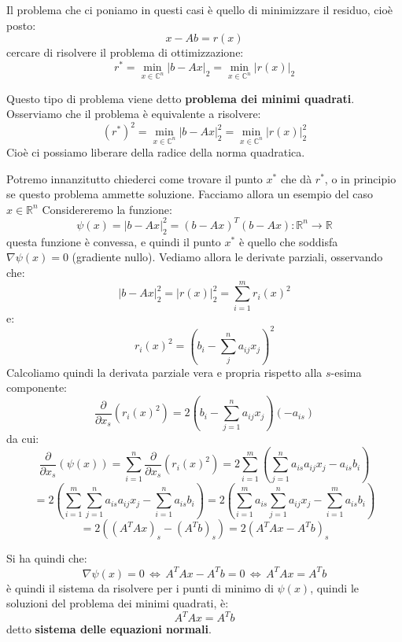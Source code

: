 \documentclass[a4paper,11pt]{article}
\begin{document}
Il problema che ci poniamo in questi casi è quello di minimizzare il residuo, cioè posto:
$$
x - Ab = r(x)
$$
cercare di risolvere il problema di ottimizzazione:
$$
r^* = \min_{x \in \mathbb{C}^n} |b - Ax|_2 = \min_{x \in \mathbb{C}^n} |r(x)|_2
$$

Questo tipo di problema viene detto \textbf{problema dei minimi quadrati}.
Osserviamo che il problema è equivalente a risolvere:
$$
\left(r^*\right)^2 = \min_{x \in \mathbb{C}^n} |b - Ax|_2^2 = \min_{x \in \mathbb{C}^n} |r(x)|_2^2
$$
Cioè ci possiamo liberare della radice della norma quadratica.

Potremo innanzitutto chiederci come trovare il punto $x^*$ che dà $r^*$, o in principio se questo problema ammette soluzione.
Facciamo allora un esempio del caso $x \in \mathbb{R}^n$
Considereremo la funzione:
$$
\psi(x) = |b - Ax|_2^2 = (b - Ax)^T (b - Ax) : \mathbb{R}^n \rightarrow \mathbb{R}
$$
questa funzione è convessa, e quindi il punto $x^*$ è quello che soddisfa $\nabla \psi(x) = 0$ (gradiente nullo).
Vediamo allora le derivate parziali, osservando che:
$$
|b - Ax|_2^2 = |r(x)|_2^2 = \sum_{i = 1}^m r_i(x)^2
$$
e:
$$
r_i(x)^2 = \left( b_i - \sum_j^n a_{ij} x_j \right)^2
$$
Calcoliamo quindi la derivata parziale vera e propria rispetto alla $s$-esima componente:
$$
\frac{\partial}{\partial x_s} \left( r_i(x)^2 \right) = 2 \left( b_i - \sum_{j = 1}^n a_{ij} x_j \right) (-a_{is}) 
$$
da cui:
$$
\frac{\partial}{\partial x_s} \left( \psi(x) \right) = \sum_{i = 1}^n \frac{\partial}{\partial x_s} \left( r_i(x)^2 \right) = 2 \sum_{i = 1}^m \left( \sum_{j = 1}^n a_{is} a_{ij} x_j - a_{is} b_i \right)
$$
$$
= 2 \left( \sum_{i = 1}^m \sum_{j = 1}^n a_{is} a_{ij} x_j - \sum_{i = 1}^n a_{is} b_i \right) = 2 \left( \sum_{i = 1}^m a_{is} \sum_{j = 1}^{n} a_{ij} x_j - \sum_{i = 1}^m a_{is} b_i \right)
$$
$$
= 2 \left( \left(A^T Ax \right)_s - \left( A^T b \right)_s \right) = 2 \left( A^T A x - A^T b \right)_s
$$

Si ha quindi che:
$$
\nabla \psi(x) = 0 \, \Leftrightarrow \, A^T A x - A^T b = 0 \, \Leftrightarrow \, A^T A x = A^T b
$$
è quindi il sistema da risolvere per i punti di minimo di $\psi(x)$, quindi le soluzioni del problema dei minimi quadrati, è:
$$
A^T A x = A^T b
$$
detto \textbf{sistema delle equazioni normali}.
\end{document}
